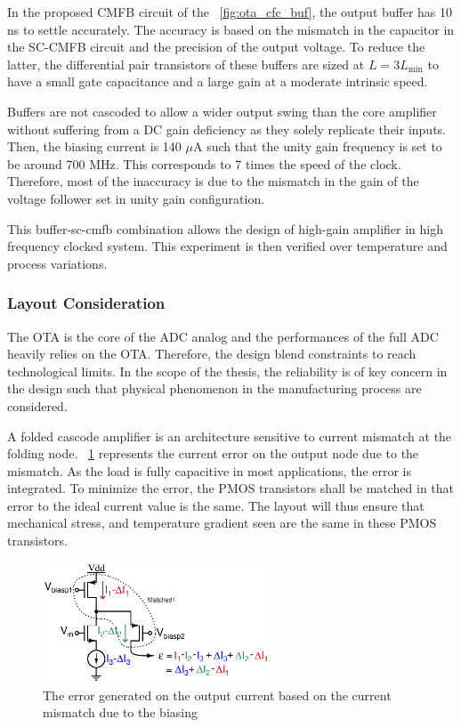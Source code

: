 In the proposed CMFB circuit of the \figurename~\ref{fig:ota_cfc_buf}, the output buffer has 10 ns to settle accurately. The accuracy is based on the mismatch in the capacitor in the SC-CMFB circuit and the precision of the output voltage. To reduce the latter, the differential pair transistors of these buffers are sized at \(L = 3 L_{\min} \) to have a small gate capacitance and a large gain at a moderate intrinsic speed. 

Buffers are not cascoded to allow a wider output swing than the core amplifier without suffering from a DC gain deficiency as they solely replicate their inputs. Then, the biasing current is 140 \(\mu \)A such that the unity gain frequency is set to be around 700 MHz. This corresponds to 7 times the speed of the clock. Therefore, most of the inaccuracy is due to the mismatch in the gain of the voltage follower set in unity gain configuration.

This buffer-sc-cmfb combination allows the design of high-gain amplifier in high frequency clocked system. This experiment is then verified over temperature and process variations.

\subsubsection{Layout Consideration}
The OTA is the core of the ADC analog and the performances of the full ADC heavily relies on the OTA\@. Therefore, the design blend constraints to reach technological limits. In the scope of the thesis, the reliability is of key concern in the design such that physical phenomenon in the manufacturing process are considered.

A folded cascode amplifier is an architecture sensitive to current mismatch at the folding node. \figurename~\ref{fig:folded-node-mismatch} represents the current error on the output node due to the mismatch. As the load is fully capacitive in most applications, the error is integrated. To minimize the error, the PMOS transistors shall be matched in that error to the ideal current value is the same. The layout will thus ensure that mechanical stress, and temperature gradient seen are the same in these PMOS transistors.

\begin{figure}[htp]
    \centering
    \includegraphics[width=0.6\textwidth]{Chapter7/Figs/folded-mismatch-gradient.ps}
    \caption{The error generated on the output current based on the current mismatch due to the biasing}
    \label{fig:folded-node-mismatch}
\end{figure}

